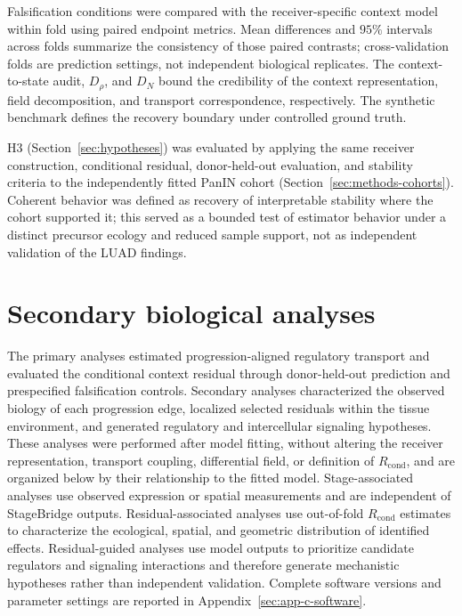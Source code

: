 Falsification conditions were compared with the receiver-specific context model
within fold using paired endpoint metrics. Mean differences and \(95\%\)
intervals across folds summarize the consistency of those paired contrasts;
cross-validation folds are prediction settings, not independent biological
replicates. The context-to-state audit, \(D_{\rho}\), and \(D_N\) bound the
credibility of the context representation, field decomposition, and transport
correspondence, respectively. The synthetic benchmark defines the recovery
boundary under controlled ground truth.

H3 (Section~\ref{sec:hypotheses}) was evaluated by applying the same receiver
construction, conditional residual, donor-held-out evaluation, and stability
criteria to the independently fitted PanIN cohort (Section~\ref{sec:methods-cohorts}).
Coherent behavior was defined as recovery of interpretable stability where the
cohort supported it; this served as a bounded test of estimator behavior under
a distinct precursor ecology and reduced sample support, not as independent
validation of the LUAD findings.



\section{Secondary biological analyses}
\label{sec:methods-biological-analyses}

The primary analyses estimated progression-aligned regulatory transport and
evaluated the conditional context residual through donor-held-out prediction
and prespecified falsification controls. Secondary analyses characterized the
observed biology of each progression edge, localized selected residuals within
the tissue environment, and generated regulatory and intercellular signaling
hypotheses. These analyses were performed after model fitting, without altering the
receiver representation, transport coupling, differential field, or definition
of \(R_{\mathrm{cond}}\), and are organized below by their relationship to the
fitted model.
Stage-associated analyses use observed expression or spatial measurements and
are independent of StageBridge outputs. Residual-associated analyses use
out-of-fold \(R_{\mathrm{cond}}\) estimates to characterize the ecological,
spatial, and geometric distribution of identified effects. Residual-guided
analyses use model outputs to prioritize candidate regulators and signaling
interactions and therefore generate mechanistic hypotheses rather than
independent validation. Complete software versions and parameter settings are
reported in Appendix~\ref{sec:app-c-software}.

